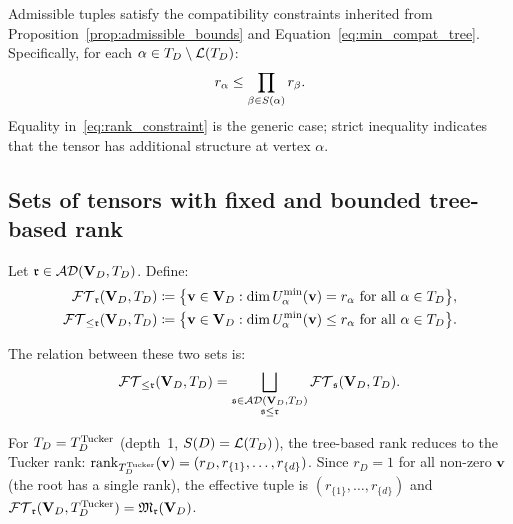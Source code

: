 \begin{remark}
\label{rem:TBT_rank_constraints}
Admissible tuples satisfy the compatibility constraints inherited from
Proposition~\ref{prop:admissible_bounds} and
Equation~\eqref{eq:min_compat_tree}. Specifically, for each
$\alpha \in T_D \setminus \mathcal{L}(T_D)$:
\begin{equation}
\label{eq:rank_constraint}
    r_\alpha \leq \prod_{\beta \in S(\alpha)} r_\beta.
\end{equation}
Equality in~\eqref{eq:rank_constraint} is the generic case; strict
inequality indicates that the tensor has additional structure at
vertex $\alpha$.
\end{remark}

\subsection*{Sets of tensors with fixed and bounded tree-based rank}

\begin{definition}
\label{def:FT_sets}
Let $\mathfrak{r} \in \mathcal{AD}(\mathbf{V}_D,T_D)$. Define:
\begin{align}
    \mathcal{FT}_{\mathfrak{r}}(\mathbf{V}_D,T_D)
    &\coloneqq \bigl\{\mathbf{v} \in \mathbf{V}_D :
        \dim U^{\min}_{\alpha}(\mathbf{v}) = r_\alpha
        \text{ for all } \alpha \in T_D\bigr\},
    \label{eq:FT_fixed} \\
    \mathcal{FT}_{\leq \mathfrak{r}}(\mathbf{V}_D,T_D)
    &\coloneqq \bigl\{\mathbf{v} \in \mathbf{V}_D :
        \dim U^{\min}_{\alpha}(\mathbf{v}) \leq r_\alpha
        \text{ for all } \alpha \in T_D\bigr\}.
    \label{eq:FT_bounded}
\end{align}
\end{definition}

The relation between these two sets is:
\begin{equation}
\label{eq:FT_union}
    \mathcal{FT}_{\leq \mathfrak{r}}(\mathbf{V}_D,T_D)
    = \bigsqcup_{\substack{\mathfrak{s} \in \mathcal{AD}(\mathbf{V}_D,T_D) \\ \mathfrak{s} \leq \mathfrak{r}}}
    \mathcal{FT}_{\mathfrak{s}}(\mathbf{V}_D, T_D).
\end{equation}

\begin{remark}
\label{rem:tucker_special}
For $T_D = T_D^{\mathrm{Tucker}}$ (depth~1, $S(D) = \mathcal{L}(T_D)$), the tree-based
rank reduces to the Tucker rank: $\mathrm{rank}_{T_D^{\mathrm{Tucker}}}(\mathbf{v})
= (r_D, r_{\{1\}}, \ldots, r_{\{d\}})$. Since $r_D = 1$ for all
non-zero $\mathbf{v}$ (the root has a single rank), the effective tuple
is $(r_{\{1\}}, \ldots, r_{\{d\}})$ and
$\mathcal{FT}_{\mathfrak{r}}(\mathbf{V}_D,T_D^{\mathrm{Tucker}}) = \mathfrak{M}_{\mathfrak{r}}(\mathbf{V}_D)$.
\end{remark}

